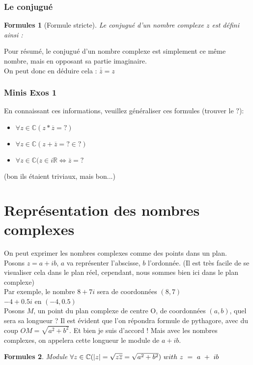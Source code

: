 \documentclass{article}
\newtheorem{form}{Formules}
\begin{document}
\subsubsection{Le conjugué}
\begin{form}[Formule stricte]
  Le conjugué d'un nombre complexe $z$ est défini ainsi :

\end{form}
Pour résumé, le conjugué d'un nombre complexe est simplement ce même nombre, mais en opposant sa partie imaginaire.\\
On peut donc en déduire cela : $\overline{\overline{z}} = z$
\subsubsection{Minis Exos 1}
En connaissant ces informations, veuillez généraliser ces formules (trouver le $?$):
\begin{itemize}
  \item $\forall z \in \mathbb{C}(z*\overline{z} = ?)$
  \item $\forall z \in \mathbb{C}(z + \overline{z} = ? \in ?)$
  \item $\forall z \in \mathbb{C}(z \in i\mathbb{R} \Leftrightarrow \overline{z} = ?$
\end{itemize}
(bon ils étaient triviaux, mais bon...)

\section{Représentation des nombres complexes}
On peut exprimer les nombres complexes comme des points dans un plan.\\
Posons $z = a + ib$, $a$ va représenter l'abscisse, $b$ l'ordonnée. (Il est très facile de se visualiser cela dans le plan réel, cependant, nous sommes bien ici dans le plan complexe)\\
Par exemple, le nombre $8 + 7i$ sera de coordonnées $(8,7)$\\$-4 + 0.5i$ en $(-4,0.5)$\\

Posons $M$, un point du plan complexe de centre O,  de coordonnées $(a,b)$, quel sera sa longueur ? Il est évident que l'on répondra formule de pythagore, avec du coup $OM = \sqrt{a^{2} + b^{2}}$. Et bien je suis d'accord ! Mais avec les nombres complexes, on appelera cette longueur le module de $a + ib$.\\
\begin{form}{Module}
$\centering{\forall z \in \mathbb{C}(|z| = \sqrt{z\overline{z}} = \sqrt{a^{2} + b^{2}})~with~z~=~a~+~ib}$
\end{form}
\end{document}
